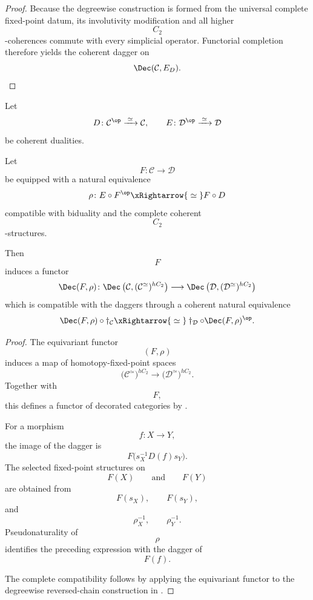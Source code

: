 \begin{proof}
Because the degreewise construction is formed from the universal
complete fixed-point datum, its involutivity modification and all higher
\[
    C_2
\]
-coherences commute with every simplicial operator. Functorial completion
therefore yields the coherent dagger on
\[
    \Dec(\mathcal C,E_D).
\]
\end{proof}

\begin{proposition}
\label{prop:fixed-point-decoration-functoriality}
Let
\[
    D
    \colon
    \mathcal C^{\op}
    \xrightarrow{\;\simeq\;}
    \mathcal C,
    \qquad
    E
    \colon
    \mathcal D^{\op}
    \xrightarrow{\;\simeq\;}
    \mathcal D
\]
be coherent dualities.

Let
\[
    F
    \colon
    \mathcal C
    \longrightarrow
    \mathcal D
\]
be equipped with a natural equivalence
\[
    \rho
    \colon
    E\circ F^{\op}
    \xRightarrow{\;\simeq\;}
    F\circ D
\]
compatible with biduality and the complete coherent
\[
    C_2
\]
-structures.

Then
\[
    F
\]
induces a functor
\[
    \Dec(F,\rho)
    \colon
    \Dec
    \left(
        \mathcal C,
        (\mathcal C^\simeq)^{hC_2}
    \right)
    \longrightarrow
    \Dec
    \left(
        \mathcal D,
        (\mathcal D^\simeq)^{hC_2}
    \right)
\]
which is compatible with the daggers through a coherent natural
equivalence
\[
    \Dec(F,\rho)\circ\dagger_{\mathcal C}
    \xRightarrow{\;\simeq\;}
    \dagger_{\mathcal D}
    \circ
    \Dec(F,\rho)^{\op}.
\]
\end{proposition}

\begin{proof}
The equivariant functor
\[
    (F,\rho)
\]
induces a map of homotopy-fixed-point spaces
\[
    \bigl(
        \mathcal C^\simeq
    \bigr)^{hC_2}
    \longrightarrow
    \bigl(
        \mathcal D^\simeq
    \bigr)^{hC_2}.
\]
Together with
\[
    F,
\]
this defines a functor of decorated categories by
.

For a morphism
\[
    f
    \colon
    X
    \longrightarrow
    Y,
\]
the image of the dagger is
\[
    F
    \bigl(
        s_X^{-1}D(f)s_Y
    \bigr).
\]
The selected fixed-point structures on
\[
    F(X)
    \qquad\text{and}\qquad
    F(Y)
\]
are obtained from
\[
    F(s_X),
    \qquad
    F(s_Y),
\]
and
\[
    \rho_X^{-1},
    \qquad
    \rho_Y^{-1}.
\]
Pseudonaturality of
\[
    \rho
\]
identifies the preceding expression with the dagger of
\[
    F(f).
\]

The complete compatibility follows by applying the equivariant functor
to the degreewise reversed-chain construction in
.
\end{proof}


